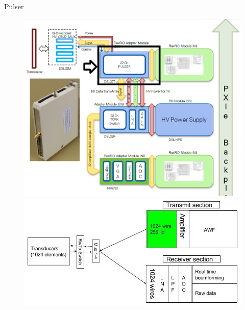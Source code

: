 \documentclass[t,12pt,english
\ifx\beamermode\undefined\else,\beamermode\fi
]{beamer}
\begin{document}
\begin{frame}{Pulser}

\begin{figure}[!htb]
\includegraphics[width=.95\textwidth]{2_2.png}
\endminipage
{}
\includegraphics[width=1\textwidth,left]{43.jpg}
\endminipage
\end{figure}

\end{frame}
\end{document}
